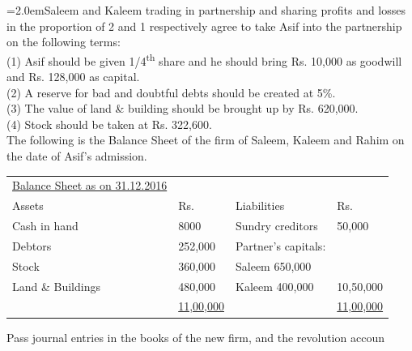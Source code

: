 \documentclass[11pt,a4paper]{article}
\newcommand{\lqn}[2]{\Needspace{6\baselineskip}\par\medskip\noindent\hangindent=2.0em\hangafter=1\makebox[2.0em][l]{\textbf{#1.}}#2\par}
\begin{document}
\lqn{88}{Saleem and Kaleem trading in partnership and sharing profits and losses in the proportion of 2 and 1 respectively agree to take Asif into the partnership on the following terms:\\
(1) Asif should be given 1/4\textsuperscript{th}  share and he should bring Rs. 10,000 as goodwill and Rs. 128,000 as capital.\\
(2) A reserve for bad and doubtful debts should be created at 5\%.\\
(3) The value of land \& building should be brought up by Rs. 620,000.\\
(4) Stock should be taken at Rs. 322,600.\\
The following is the Balance Sheet of the firm of Saleem, Kaleem and Rahim on the date of Asif’s admission.\par
\par\smallskip\noindent\hspace*{1.2em}\begin{tabular}{|llll|}
\hline
\underline{Balance Sheet as on 31.12.2016} &  &  &  \\
Assets & Rs. & Liabilities & Rs. \\
Cash in hand & 8000 & Sundry creditors & 50,000 \\
Debtors & 252,000 & Partner’s capitals: &  \\
Stock & 360,000 & Saleem   650,000 &  \\
Land \& Buildings & 480,000 & Kaleem   400,000 & 10,50,000 \\
 & \underline{11,00,000} &  & \underline{11,00,000} \\
\hline
\end{tabular}\par\smallskip
Pass journal entries in the books of the new firm, and the revolution accoun\par
}
\end{document}
